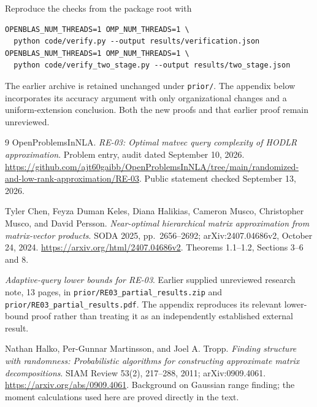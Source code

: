 \documentclass[11pt]{article}
\theoremstyle{remark}
\begin{document}
Reproduce the checks from the package root with
\begin{lstlisting}
OPENBLAS_NUM_THREADS=1 OMP_NUM_THREADS=1 \
  python code/verify.py --output results/verification.json
OPENBLAS_NUM_THREADS=1 OMP_NUM_THREADS=1 \
  python code/verify_two_stage.py --output results/two_stage.json
\end{lstlisting}
The earlier archive is retained unchanged under \texttt{prior/}. The
appendix below incorporates its accuracy argument with only organizational
changes and a uniform-extension conclusion. Both the new proofs and that
earlier proof remain unreviewed.

\clearpage
\appendix


\begin{thebibliography}{9}
OpenProblemsInNLA. \emph{RE-03: Optimal matvec query complexity of HODLR
approximation}. Problem entry, audit dated September 10, 2026.
\url{https://github.com/ajt60gaibb/OpenProblemsInNLA/tree/main/randomized-and-low-rank-approximation/RE-03}.
Public statement checked September 13, 2026.

Tyler Chen, Feyza Duman Keles, Diana Halikias, Cameron Musco, Christopher Musco,
and David Persson.
\emph{Near-optimal hierarchical matrix approximation from matrix-vector
products}. SODA 2025, pp.~2656--2692; arXiv:2407.04686v2, October 24, 2024.
\url{https://arxiv.org/html/2407.04686v2}.
Theorems 1.1--1.2, Sections 3--6 and 8.

\emph{Adaptive-query lower bounds for RE-03}.
Earlier supplied unreviewed research note, 13 pages, in
\texttt{prior/RE03\_partial\_results.zip} and
\texttt{prior/RE03\_partial\_results.pdf}.
The appendix reproduces its relevant lower-bound proof rather than treating
it as an independently established external result.

Nathan Halko, Per-Gunnar Martinsson, and Joel A. Tropp.
\emph{Finding structure with randomness: Probabilistic algorithms for
constructing approximate matrix decompositions}.
SIAM Review 53(2), 217--288, 2011; arXiv:0909.4061.
\url{https://arxiv.org/abs/0909.4061}.
Background on Gaussian range finding; the moment calculations used here are
proved directly in the text.
\end{thebibliography}
\end{document}

